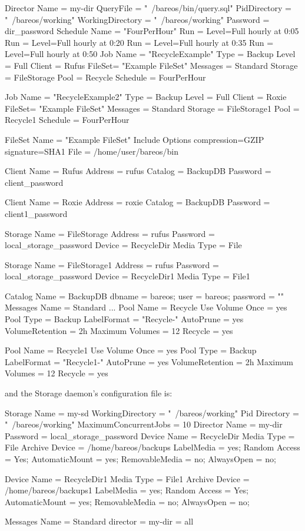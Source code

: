 \begin{bconfig}{}
Director {
  Name = my-dir
  QueryFile = "~/bareos/bin/query.sql"
  PidDirectory = "~/bareos/working"
  WorkingDirectory = "~/bareos/working"
  Password = dir_password
}
Schedule {
  Name = "FourPerHour"
  Run = Level=Full hourly at 0:05
  Run = Level=Full hourly at 0:20
  Run = Level=Full hourly at 0:35
  Run = Level=Full hourly at 0:50
}
Job {
  Name = "RecycleExample"
  Type = Backup
  Level = Full
  Client = Rufus
  FileSet= "Example FileSet"
  Messages = Standard
  Storage = FileStorage
  Pool = Recycle
  Schedule = FourPerHour
}

Job {
  Name = "RecycleExample2"
  Type = Backup
  Level = Full
  Client = Roxie
  FileSet= "Example FileSet"
  Messages = Standard
  Storage = FileStorage1
  Pool = Recycle1
  Schedule = FourPerHour
}

FileSet {
  Name = "Example FileSet"
  Include {
    Options {
      compression=GZIP
      signature=SHA1
    }
    File = /home/user/bareos/bin
  }
}

Client {
  Name = Rufus
  Address = rufus
  Catalog = BackupDB
  Password = client_password
}

Client {
  Name = Roxie
  Address = roxie
  Catalog = BackupDB
  Password = client1_password
}

Storage {
  Name = FileStorage
  Address = rufus
  Password = local_storage_password
  Device = RecycleDir
  Media Type = File
}

Storage {
  Name = FileStorage1
  Address = rufus
  Password = local_storage_password
  Device = RecycleDir1
  Media Type = File1
}

Catalog {
  Name = BackupDB
  dbname = bareos; user = bareos; password = ""
}
Messages {
  Name = Standard
  ...
}
Pool {
  Name = Recycle
  Use Volume Once = yes
  Pool Type = Backup
  LabelFormat = "Recycle-"
  AutoPrune = yes
  VolumeRetention = 2h
  Maximum Volumes = 12
  Recycle = yes
}

Pool {
  Name = Recycle1
  Use Volume Once = yes
  Pool Type = Backup
  LabelFormat = "Recycle1-"
  AutoPrune = yes
  VolumeRetention = 2h
  Maximum Volumes = 12
  Recycle = yes
}

\end{bconfig}

and the Storage daemon's configuration file is:

\begin{bconfig}{}
Storage {
  Name = my-sd
  WorkingDirectory = "~/bareos/working"
  Pid Directory = "~/bareos/working"
  MaximumConcurrentJobs = 10
}
Director {
  Name = my-dir
  Password = local_storage_password
}
Device {
  Name = RecycleDir
  Media Type = File
  Archive Device = /home/bareos/backups
  LabelMedia = yes;
  Random Access = Yes;
  AutomaticMount = yes;
  RemovableMedia = no;
  AlwaysOpen = no;
}

Device {
  Name = RecycleDir1
  Media Type = File1
  Archive Device = /home/bareos/backups1
  LabelMedia = yes;
  Random Access = Yes;
  AutomaticMount = yes;
  RemovableMedia = no;
  AlwaysOpen = no;
}

Messages {
  Name = Standard
  director = my-dir = all
}
\end{bconfig}

